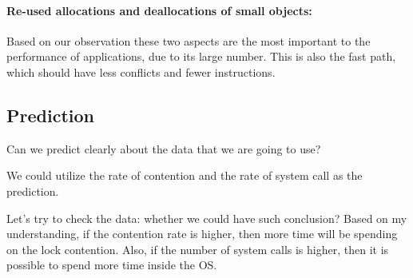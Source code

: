 \paragraph{Re-used allocations and deallocations of small objects:} Based on our observation these two aspects are the most important to the  performance of applications, due to its large number. This is also the fast path, which should have less conflicts and fewer instructions.  



\subsection{Prediction}
Can we predict clearly about the data that we are going to use? 

We could utilize the rate of contention and the rate of system call as the prediction.

Let's try to check the data: whether we could have such conclusion? Based on my understanding, if the contention rate is higher, then more time will be spending on the lock contention. Also, if the number of system calls is higher, then it is possible to spend more time inside the OS. 